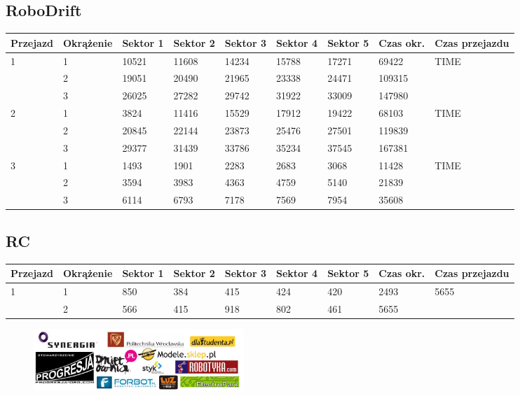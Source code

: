 \documentclass[11pt]{article}
\begin{document}
\subsection{RoboDrift}
\begin{table}[h]
\begin{tabular}{|l|l|l|l|l|l|l|l|l|}
\hline
   Przejazd        & Okrążenie & Sektor 1 & Sektor 2 & Sektor 3 & Sektor 4 & Sektor 5 & Czas okr. & Czas przejazdu    \\ \hline
\multirow{3}{*}{1}& 1 &10521& 11608& 14234& 15788& 17271& 69422& \multirow{3}{*}{TIME} \\ \cline{2-8}
& 2& 19051& 20490& 21965& 23338& 24471& 109315& \\ \cline{2-8}
& 3& 26025& 27282& 29742& 31922& 33009& 147980& \\ \hline
\multirow{3}{*}{2}& 1 &3824& 11416& 15529& 17912& 19422& 68103& \multirow{3}{*}{TIME} \\ \cline{2-8}
& 2& 20845& 22144& 23873& 25476& 27501& 119839& \\ \cline{2-8}
& 3& 29377& 31439& 33786& 35234& 37545& 167381& \\ \hline
\multirow{3}{*}{3}& 1 &1493& 1901& 2283& 2683& 3068& 11428& \multirow{3}{*}{TIME} \\ \cline{2-8}
& 2& 3594& 3983& 4363& 4759& 5140& 21839& \\ \cline{2-8}
& 3& 6114& 6793& 7178& 7569& 7954& 35608& \\ \hline
\end{tabular}
\end{table}
\subsection{RC}
\begin{table}[h]
\begin{tabular}{|l|l|l|l|l|l|l|l|l|}
\hline
 Przejazd        & Okrążenie & Sektor 1 & Sektor 2 & Sektor 3 & Sektor 4 & Sektor 5 & Czas okr. & Czas przejazdu    \\ \hline
\multirow{2}{*}{1}& 1 &850& 384& 415& 424& 420& 2493& \multirow{2}{*}{5655} \\ \cline{2-8}
& 2& 566& 415& 918& 802& 461& 5655& \\ \hline
\end{tabular}
\end{table}
\clearpage
\newpage
\begin{figure}
\centering
\includegraphics[width=300px, keepaspectratio=true]
{images/sponsors.jpg}
\end{figure}
\end{document}
